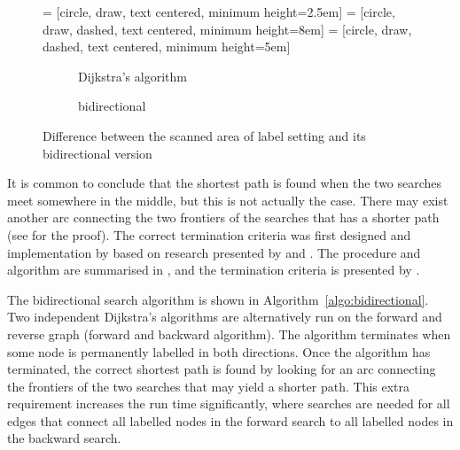 \begin{figure}[H]
     = [circle, draw, text centered, minimum height=2.5em]
     = [circle, draw, dashed, text centered, minimum height=8em]
     = [circle, draw, dashed, text centered, minimum height=5em]
    \centering
    \begin{subfigure}[t]{.4\textwidth}
        \centering
        \caption{Dijkstra's algorithm}
    \end{subfigure}
    \begin{subfigure}[t]{.4\textwidth}
        \centering
        \caption{bidirectional}
    \end{subfigure}
    \caption{Difference between the scanned area of label setting and its bidirectional version}
    \label{fig:bidirect}
\end{figure}

It is common to conclude that the shortest path is found when the two searches meet somewhere in the middle,
but this is not actually the case.
There may exist another arc connecting the two frontiers of the searches that has a shorter path (see \citet{Klunder} for the proof).
The correct termination criteria was first designed and implementation by \citet{Pohl} based on research presented by \citet{Dantzig, Nicholson} and \citet{Dreyfus}.
The procedure and algorithm are summarised in \citet{Klunder}, and the termination criteria is presented by \citet{Pohl}.

The bidirectional search algorithm is shown in Algorithm~\ref{algo:bidirectional}.
Two independent Dijkstra's algorithms are alternatively run on the forward and reverse graph (forward and backward algorithm).
The algorithm terminates when some node is permanently labelled in both directions.
Once the algorithm has terminated,
the correct shortest path is found by looking for an arc connecting the frontiers of the two searches that may yield a shorter path.
This extra requirement increases the run time significantly, 
where searches are needed for all edges that connect all labelled nodes in the forward search to all labelled nodes in the backward search.

